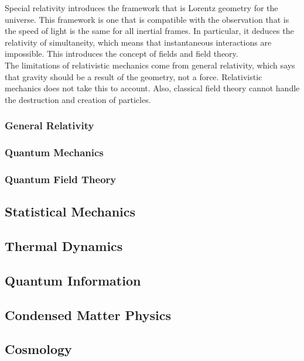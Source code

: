 \documentclass[a4paper]{article}
\begin{document}
Special relativity introduces the framework that is Lorentz geometry for the universe. This framework is one that is compatible with the observation that is the speed of light is the same for all inertial frames. In particular, it deduces the relativity of simultaneity, which means that instantaneous interactions are impossible. This introduces the concept of fields and field theory. \\

The limitations of relativistic mechanics come from general relativity, which says that gravity should be a result of the geometry, not a force. Relativistic mechanics does not take this to account. Also, classical field theory cannot handle the destruction and creation of particles. 

\subsubsection*{General Relativity}

\subsubsection*{Quantum Mechanics}

\subsubsection*{Quantum Field Theory}

\subsection*{Statistical Mechanics}

\subsection*{Thermal Dynamics}

\subsection*{Quantum Information}

\subsection*{Condensed Matter Physics}

\subsection*{Cosmology}
\end{document}
